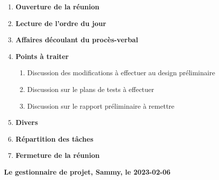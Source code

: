 \documentclass[12pt]{ULojpv}
\begin{document}
\entete
\begin{enumerate}
   \item \textbf{Ouverture de la réunion}
   \item \textbf{Lecture de l'ordre du jour}
   \item \textbf{Affaires découlant du procès-verbal}
   
   \item \textbf{Points à traiter}
      \begin{enumerate}
         \item Discussion des modifications à effectuer au design préliminaire
         \item Discussion sur le plans de tests à effectuer
         \item Discussion sur le rapport préliminaire à remettre
      \end{enumerate}
   \item \textbf{Divers}
   \item \textbf{Répartition des tâches}

   \item \textbf{Fermeture de la réunion}
\end{enumerate}

\begin{flushright}
   \textbf{Le gestionnaire de projet, Sammy, le 2023-02-06}

\end{flushright}
\end{document}
